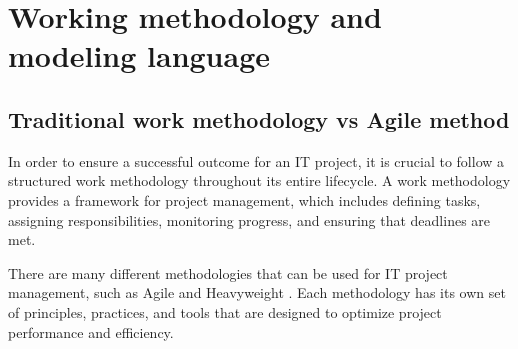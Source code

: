 \section{Working methodology and modeling language}
\subsection{Traditional work methodology vs Agile method }
In order to ensure a successful outcome for an IT project, it is crucial to follow a structured work methodology throughout its entire lifecycle. A work methodology provides a framework for project management, which includes defining tasks, assigning responsibilities, monitoring progress, and ensuring that deadlines are met.\cite{PGC10}


\vspace{0.25cm}
There are many different methodologies that can be used for IT project management, such as Agile\cite{Aw15} and Heavyweight\cite{Aw15} . Each methodology has its own set of principles, practices, and tools that are designed to optimize project performance and efficiency.

